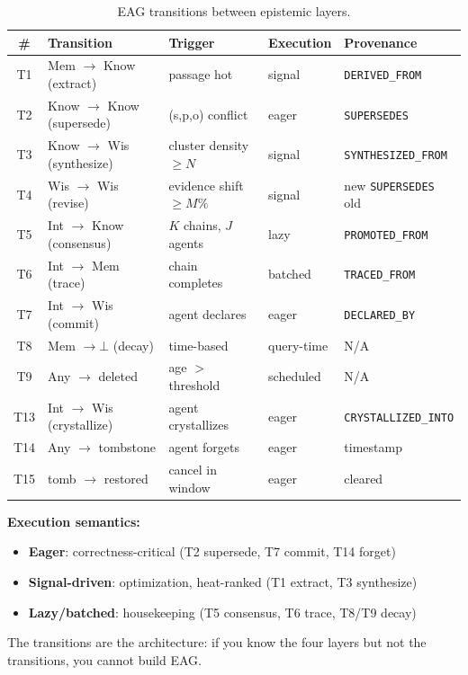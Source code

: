 \documentclass[11pt,a4paper]{article}
\begin{document}
\begin{table}[H]
\centering
\caption{EAG transitions between epistemic layers.}
\label{tab:transitions}
\begin{tabular}{@{}clllp{3.8cm}@{}}
\toprule
\textbf{\#} & \textbf{Transition} & \textbf{Trigger} & \textbf{Execution} & \textbf{Provenance} \\
\midrule
T1 & Mem $\to$ Know (extract) & passage hot & signal & \texttt{DERIVED\_FROM} \\
T2 & Know $\to$ Know (supersede) & (s,p,o) conflict & eager & \texttt{SUPERSEDES} \\
T3 & Know $\to$ Wis (synthesize) & cluster density $\geq N$ & signal & \texttt{SYNTHESIZED\_FROM} \\
T4 & Wis $\to$ Wis (revise) & evidence shift $\geq M\%$ & signal & new \texttt{SUPERSEDES} old \\
T5 & Int $\to$ Know (consensus) & $K$ chains, $J$ agents & lazy & \texttt{PROMOTED\_FROM} \\
T6 & Int $\to$ Mem (trace) & chain completes & batched & \texttt{TRACED\_FROM} \\
T7 & Int $\to$ Wis (commit) & agent declares & eager & \texttt{DECLARED\_BY} \\
T8 & Mem $\to \bot$ (decay) & time-based & query-time & N/A \\
T9 & Any $\to$ deleted & age $>$ threshold & scheduled & N/A \\
T13 & Int $\to$ Wis (crystallize) & agent crystallizes & eager & \texttt{CRYSTALLIZED\_INTO} \\
T14 & Any $\to$ tombstone & agent forgets & eager & timestamp \\
T15 & tomb $\to$ restored & cancel in window & eager & cleared \\
\bottomrule
\end{tabular}
\end{table}

\textbf{Execution semantics:}
\begin{itemize}[noitemsep]
    \item \textbf{Eager}: correctness-critical (T2 supersede, T7 commit, T14 forget)
    \item \textbf{Signal-driven}: optimization, heat-ranked (T1 extract, T3 synthesize)
    \item \textbf{Lazy/batched}: housekeeping (T5 consensus, T6 trace, T8/T9 decay)
\end{itemize}

The transitions are the architecture: if you know the four layers but not the transitions, you cannot build EAG.
\end{document}
